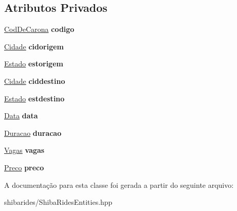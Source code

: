 \subsection*{Atributos Privados}
\begin{DoxyCompactItemize}
\item 
\hyperlink{classshibarides_1_1CodDeCarona}{Cod\+De\+Carona} {\bfseries codigo}\hypertarget{classshibarides_1_1Carona_a7b00981c5d5cea183feb2ca4d760911e}{}\label{classshibarides_1_1Carona_a7b00981c5d5cea183feb2ca4d760911e}

\item 
\hyperlink{classshibarides_1_1Cidade}{Cidade} {\bfseries cidorigem}\hypertarget{classshibarides_1_1Carona_adc888314cb15f45314f7a11e0b05f6d8}{}\label{classshibarides_1_1Carona_adc888314cb15f45314f7a11e0b05f6d8}

\item 
\hyperlink{classshibarides_1_1Estado}{Estado} {\bfseries estorigem}\hypertarget{classshibarides_1_1Carona_a6dace71d7fb30f46f0a16cfd67d26287}{}\label{classshibarides_1_1Carona_a6dace71d7fb30f46f0a16cfd67d26287}

\item 
\hyperlink{classshibarides_1_1Cidade}{Cidade} {\bfseries ciddestino}\hypertarget{classshibarides_1_1Carona_abac6f586588317b57d7c5b83ae3f4c6e}{}\label{classshibarides_1_1Carona_abac6f586588317b57d7c5b83ae3f4c6e}

\item 
\hyperlink{classshibarides_1_1Estado}{Estado} {\bfseries estdestino}\hypertarget{classshibarides_1_1Carona_afc2464789b24fb27ac8b4c769683c90b}{}\label{classshibarides_1_1Carona_afc2464789b24fb27ac8b4c769683c90b}

\item 
\hyperlink{classshibarides_1_1Data}{Data} {\bfseries data}\hypertarget{classshibarides_1_1Carona_abdc97cb7684302dc4d1e580613acd3cc}{}\label{classshibarides_1_1Carona_abdc97cb7684302dc4d1e580613acd3cc}

\item 
\hyperlink{classshibarides_1_1Duracao}{Duracao} {\bfseries duracao}\hypertarget{classshibarides_1_1Carona_aa4434820ca3b9bd4e6b3bfb7d9b6749d}{}\label{classshibarides_1_1Carona_aa4434820ca3b9bd4e6b3bfb7d9b6749d}

\item 
\hyperlink{classshibarides_1_1Vagas}{Vagas} {\bfseries vagas}\hypertarget{classshibarides_1_1Carona_a1bb8450bb0575d860527746cd079f80f}{}\label{classshibarides_1_1Carona_a1bb8450bb0575d860527746cd079f80f}

\item 
\hyperlink{classshibarides_1_1Preco}{Preco} {\bfseries preco}\hypertarget{classshibarides_1_1Carona_a72dbfd71e7f0a54a58f2ff851ead0fc2}{}\label{classshibarides_1_1Carona_a72dbfd71e7f0a54a58f2ff851ead0fc2}

\end{DoxyCompactItemize}


A documentação para esta classe foi gerada a partir do seguinte arquivo\+:\begin{DoxyCompactItemize}
\item 
shibarides/Shiba\+Rides\+Entities.\+hpp\end{DoxyCompactItemize}
